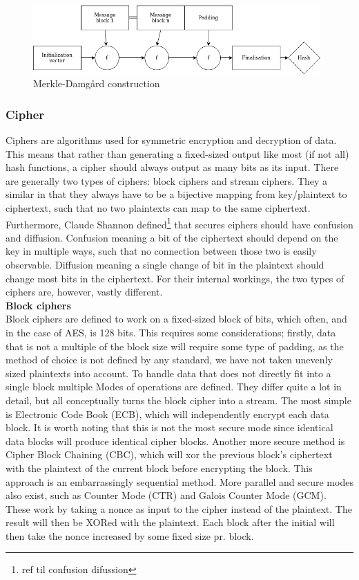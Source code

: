 \documentclass[a4paper]{article}
\begin{document}
\begin{figure}[H]
\centering
\includegraphics[width=11cm]{merkle.png}
\caption{Merkle-Damgård construction}
\label{fig:Merkle}
\end{figure}
\subsubsection{Cipher}
\label{sec:org060ccaa}
Ciphers are algorithms used for symmetric encryption and decryption of data. This means that rather than generating a fixed-sized output like most (if not all) hash functions, a cipher should always output as many bits as its input. There are generally two types of ciphers: block ciphers and stream ciphers. They a similar in that they always have to be a bijective mapping from key/plaintext to ciphertext, such that no two plaintexts can map to the same ciphertext. Furthermore, Claude Shannon defined\footnote{ref til confusion difussion} that secures ciphers should have confusion and diffusion. Confusion meaning a bit of the ciphertext should depend on the key in multiple ways, such that no connection between those two is easily observable. Diffusion meaning a single change of bit in the plaintext should change most bits in the ciphertext. For their internal workings, the two types of ciphers are, however, vastly different.\\

\textbf{Block ciphers}\\
Block ciphers are defined to work on a fixed-sized block of bits, which often, and in the case of AES, is 128 bits. This requires some considerations; firstly, data that is not a multiple of the block size will require some type of padding, as the method of choice is not defined by any standard, we have not taken unevenly sized plaintexts into account. To handle data that does not directly fit into a single block multiple Modes of operations are defined. They differ quite a lot in detail, but all conceptually turns the block cipher into a stream. The most simple is Electronic Code Book (ECB), which will independently encrypt each data block. It is worth noting that this is not the most secure mode since identical data blocks will produce identical cipher blocks. Another more secure method is Cipher Block Chaining (CBC), which will xor the previous block's ciphertext with the plaintext of the current block before encrypting the block. This approach is an embarrassingly sequential method. More parallel and secure modes also exist, such as Counter Mode (CTR) and Galois Counter Mode (GCM). These work by taking a nonce as input to the cipher instead of the plaintext. The result will then be XORed with the plaintext. Each block after the initial will then take the nonce increased by some fixed size pr. block.\\
\end{document}
